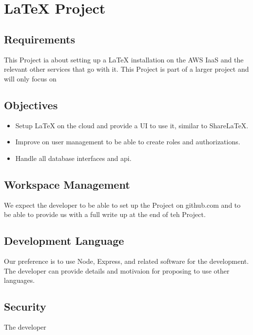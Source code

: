 \chapter{LaTeX Project}


\section{Requirements}

This Project ia about setting up a LaTeX installation on the AWS IaaS and the relevant other services that go with it. This Project is part of a larger project and will only focus on 

\section{Objectives}

\begin{itemize}
 \item  Setup LaTeX on the cloud and provide a UI to use it, similar to ShareLaTeX.
        
 \item Improve on user management to be able to create roles and authorizations.
 
 \item Handle all database interfaces and api.
\end{itemize}

\section{Workspace Management}

We expect the developer to be able to set up the Project on github.com and to be able to provide us with a full write up at the end of teh Project.

\section{Development Language}

Our preference is to use Node, Express, and related software for the development. The developer can provide details and motivaion for proposing to use other languages.


\section{Security}

The developer

